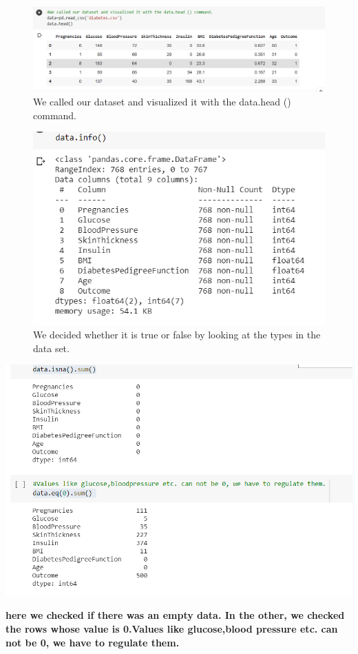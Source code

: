 \documentclass[onecolumn]{article}
\begin{document}
\begin{figure}[hb]
\centering
   \includegraphics[scale=2,width=.9\linewidth]{head.png}
\caption{\label{fig:code-1}
We called our dataset and visualized it with the data.head () command.}
\end{figure}
\begin{figure}[hb]
\centering
   \includegraphics[scale=2,width=.9\linewidth]{info.png}
\caption{\label{fig:code-1}
We decided whether it is true or false by looking at the types in the data set.}
\end{figure}
\begin{center}
    

   \includegraphics[scale=2,width=.9\linewidth]{double.png}

    \textbf{here we checked if there was an empty data. In the other, we checked the rows whose value is 0.Values like glucose,blood pressure etc. can not be 0, we have to regulate them.}\\
\end{center}
\end{document}
